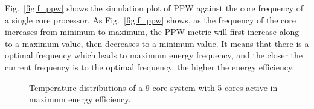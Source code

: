 Fig.~\ref{fig:f_ppw} shows the simulation plot of PPW against the core frequency of a single core processor. As Fig.~\ref{fig:f_ppw} shows, as the frequency of the core increases from minimum to maximum, the PPW metric will first increase along to a maximum value, then decreases to a minimum value. It means that there is a optimal frequency which leads to maximum energy frequency, and the closer the current frequency is to the optimal frequency, the higher the energy efficiency.


\begin{figure}
  \centering
  \caption{Temperature distributions of a 9-core system with 5 cores active in maximum energy efficiency.}
  \label{fig:opt_tem}
\end{figure}




